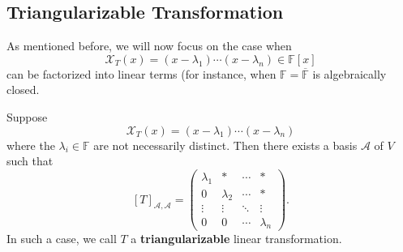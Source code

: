 \subsection{Triangularizable Transformation}
As mentioned before, we will now focus on the case when 
\[
\mathcal{X}_T(x) = (x - \lambda_1) \cdots (x - \lambda_n) \in \mathbb{F}[x]
\]
can be factorized into linear terms (for instance, when $\mathbb{F} = \overline{\mathbb{F}}$ is algebraically closed.
\begin{proposition}\label{prop:upper-triangular-form}
Suppose
\[
\mathcal{X}_T(x) = (x - \lambda_1) \cdots (x - \lambda_n)
\]
where the \( \lambda_i \in \mathbb{F} \) are not necessarily distinct. Then there exists a basis \( \mathcal{A} \) of \( V \) such that
\[
[T]_{\mathcal{A}, \mathcal{A}} =
\begin{pmatrix}
\lambda_1 & * & \cdots & * \\
0 & \lambda_2 & \cdots & * \\
\vdots & \vdots & \ddots & \vdots \\
0 & 0 & \cdots & \lambda_n
\end{pmatrix}.
\]
In such a case, we call $T$ a {\bf triangularizable} linear transformation.
\end{proposition}

